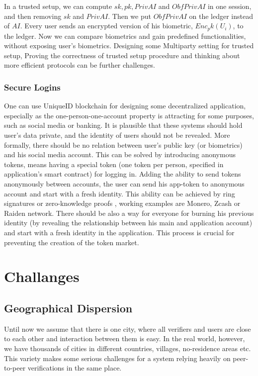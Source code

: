 \documentclass[conference]{IEEEtran}
\begin{document}
In a trusted setup, we can compute $sk,pk,PrivAI$ and $ObfPrivAI$ in one session, and then removing $sk$ and $PrivAI$. Then we put $ObfPrivAI$ on the ledger instead of $AI$. Every user sends an encrypted version of his biometric, $Enc_pk(U_i)$, to the ledger. Now we can compare biometrics and gain predefined functionalities, without exposing user's biometrics. Designing some Multiparty setting for trusted setup, Proving the correctness of trusted setup procedure and thinking about more efficient protocols can be further challenges. 

\subsubsection*{Secure Logins}
One can use UniqueID blockchain for designing some decentralized application, especially as the one-person-one-account property is attracting for some purposes, such as social media or banking. It is plausible that these systems should hold user's data private, and the identity of users should not be revealed. More formally, there should be no relation between user's public key (or biometrics) and his social media account. This can be solved by introducing anonymous tokens, means having a special token (one token per person, specified in application's smart contract) for logging in. Adding the ability to send tokens anonymously between accounts, the user can send his app-token to anonymous account and start with a fresh identity. This ability can be achieved by ring signatures \cite{RingSig} or zero-knowledge proofs \cite{ZeroKnowledge}, working examples are  Monero, Zcash or Raiden network. There should be also a way for everyone for burning his previous identity (by revealing the relationship between his main and application account) and start with a fresh identity in the application. This process is crucial for preventing the creation of the token market.



\section{Challanges}


\subsection{Geographical Dispersion}
Until now we assume that there is one city, where all verifiers and users are close to each other and interaction between them is easy. In the real world, however, we have thousands of cities in different countries, villages, no-residence areas etc. This variety makes some serious challenges for a system relying heavily on peer-to-peer verifications in the same place.
\end{document}
